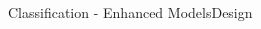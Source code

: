 \documentclass{beamer}
\begin{document}
\begin{frame}{Classification - Enhanced Models}{Design}
\begin{columns}
\begin{column}{0.2\textwidth}
\begin{figure}[p]
{			}
		\end{figure}		
	\end{column}
	\begin{column}{0.2\textwidth}  %
	\begin{figure}[p]
	\end{figure}
	\begin{figure}[p]
	\resizebox{.6\textwidth}{!}{
}
\end{figure}
\end{column}
\end{columns}
\end{frame}
\end{document}
